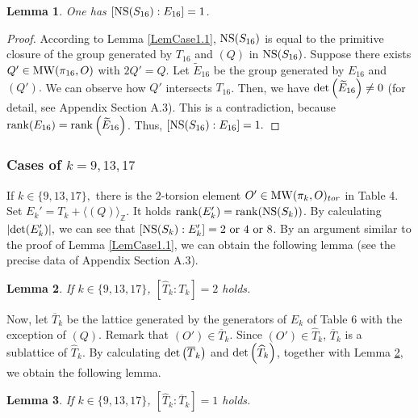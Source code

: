 \documentclass[10pt]{article}
\newtheorem{lem}{Lemma}[section]
\begin{document}
\begin{lem}\label{LemCase1.2}
One has   $\left[{\rm NS}(S_{16}): E_{16} \right] =1$.
\end{lem}

\begin{proof}
According to Lemma \ref{LemCase1.1}, 
${\rm NS}(S_{16}) $
is equal to the primitive closure of the group generated by
$T_{16}$ and $(Q)$ in ${\rm NS}(S_{16}) $.
Suppose there exists $Q'\in {\rm MW}(\pi_{16}, O)$ with $2 Q' =Q$.
Let $\widetilde{E}_{16}$ be the group generated by $E_{16}$ and $(Q').$
We can observe how $Q'$ intersects $T_{16}$.
Then, we have ${\rm det}\left( \widetilde{E}_{16} \right)\not=0 $  (for detail, see Appendix Section A.3).
This is a contradiction, because ${\rm rank}(E_{16}) = {\rm rank} \left(\widetilde{E}_{16} \right)$.
Thus, $\left[ {\rm NS}(S_{16}) : E_{16} \right]=1.$
\end{proof}


\subsubsection{Cases of $k= 9,  13, 17$}

If  $k\in \{9,13,17\},$ there is the $2$-torsion element $O' \in {\rm MW}(\pi_k, O)_{tor}$ in Table 4.
Set $E_k' = T_k + \langle (Q) \rangle_\mathbb{Z} $.
It holds ${\rm rank} (E_k') = {\rm rank} ({\rm NS}(S_k))$.
By calculating $|{\rm det} (E_k')|,$ we can see that $\left[{\rm NS}(S_k): E_k' \right] =2 \text{ or } 4 \text{ or } 8$.
By an argument similar to the proof of  Lemma \ref{LemCase1.1}, we can obtain the following lemma  
(see the precise data of Appendix Section A.3).

\begin{lem}\label{LemCase2.1}
If $k\in \{9, 13, 17\}$, $\left[\widehat{T}_k : T_k\right]=2$ holds.
\end{lem}


Now, let $\overline{T}_k$ be the lattice generated by the generators of $E_k$ of Table 6 with the exception of $(Q)$.
Remark that $(O')\in \overline{T}_k $.
Since $(O') \in  \widehat{T}_k$, $\overline{T}_k $ is a sublattice of $\widehat{T}_k$.
By calculating ${\rm det}\left( \overline{T}_k \right)$ and ${\rm det} \left( \widehat{T}_k \right)$, together with Lemma \ref{LemCase2.1},  we obtain the following lemma.

\begin{lem}\label{LemCase2.2}
If $k\in \{9, 13, 17\}$, $\left[\widehat{T}_k : \overline{T}_k\right]=1$ holds.
\end{lem}
 
\end{document}
